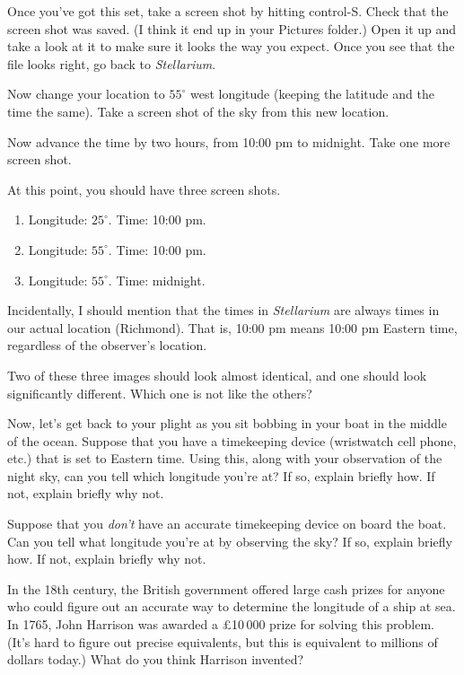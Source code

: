 Once you've got this set, take a screen shot by hitting control-S.
Check that the screen shot was saved. (I think
it end up in your Pictures folder.)
Open it up and take a look at it to make sure it looks
the way you expect. 
Once you see that the file looks right, go back to \textit{Stellarium}.

Now change your location to $55^\circ$ west longitude (keeping
the latitude and the time the same).
Take a screen shot of the sky from this new location.

Now advance the time by two hours, from 10:00 pm to midnight.
Take one more screen shot.

At this point, you should have three screen shots.
\begin{enumerate}
\item Longitude: $25^\circ$. Time: 10:00 pm.
\item Longitude: $55^\circ$. Time: 10:00 pm.
\item Longitude: $55^\circ$. Time: midnight.
\end{enumerate}
Incidentally, I should mention that the times in \textit{Stellarium}
are always times in our actual location (Richmond). That is, 10:00 pm
means 10:00 pm Eastern time, regardless of the observer's location.

Two of these three images should look almost identical, and one
should look significantly different. Which one is not like the others?

\vskip 1in

\newpage

Now, let's get back to your plight as you sit bobbing in your boat
in the middle of the ocean. Suppose that you have a timekeeping
device (wristwatch cell phone, etc.) that is set to Eastern
time. Using this, along with your observation of the night
sky, can you tell which longitude you're at? If so, explain
briefly how. If not, explain briefly why not.

\vskip 3in

Suppose that you \textit{don't} have an accurate timekeeping device
on board the boat. Can you tell what longitude you're at by
observing the sky? If so, explain
briefly how. If not, explain briefly why not.

\vskip 3in

In the 18th century, the British government offered large
cash prizes for anyone who could figure out an accurate way
to determine the longitude of a ship at sea. 
In 1765, John Harrison was awarded a \pounds 10\,000 prize
for solving this problem. (It's hard to
figure out precise equivalents, but this is 
equivalent to  millions of dollars today.) 
What do you think Harrison invented?

